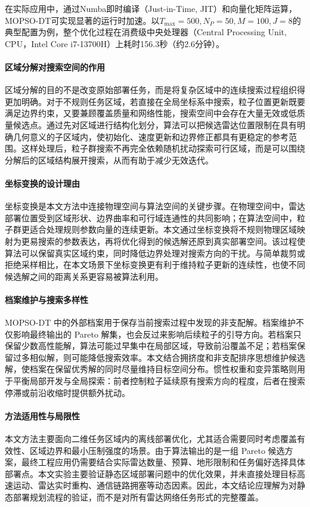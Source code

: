 在实际应用中，通过Numba即时编译（Just-in-Time, JIT）和向量化矩阵运算，MOPSO-DT可实现显著的运行时加速。以$T_{\max}=500, N_P=50, M=100, J=8$的典型配置为例，整个优化过程在消费级中央处理器（Central Processing Unit, CPU，Intel Core i7-13700H）上耗时156.3秒（约2.6分钟）。

\FloatBarrier


\paragraph{区域分解对搜索空间的作用}
区域分解的目的不是改变原始部署任务，而是将复杂区域中的连续搜索过程组织得更加明确。对于不规则任务区域，若直接在全局坐标系中搜索，粒子位置更新既要满足边界约束，又要兼顾覆盖质量和网络性能，搜索空间中会存在大量无效或低质量候选点。通过先对区域进行结构化划分，算法可以把候选雷达位置限制在具有明确几何意义的子区域内，使初始化、速度更新和边界修正都具有更稳定的参考范围。这样处理后，粒子群搜索不再完全依赖随机扰动探索可行区域，而是可以围绕分解后的区域结构展开搜索，从而有助于减少无效迭代。

\paragraph{坐标变换的设计理由}
坐标变换是本文方法中连接物理空间与算法空间的关键步骤。在物理空间中，雷达部署位置受到区域形状、边界曲率和可行域连通性的共同影响；在算法空间中，粒子群更适合处理规则参数向量的连续更新。本文通过坐标变换将不规则物理区域映射为更易搜索的参数表达，再将优化得到的候选解还原到真实部署空间。该过程使算法可以保留真实区域约束，同时降低边界处理对搜索方向的干扰。与简单裁剪或拒绝采样相比，在本文场景下坐标变换更有利于维持粒子更新的连续性，也使不同候选解之间的距离关系更容易被算法利用。

\paragraph{档案维护与搜索多样性}
MOPSO-DT 中的外部档案用于保存当前搜索过程中发现的非支配解。档案维护不仅影响最终输出的 Pareto 解集，也会反过来影响后续粒子的引导方向。若档案只保留少数高性能解，算法可能过早集中在局部区域，导致前沿覆盖不足；若档案保留过多相似解，则可能降低搜索效率。本文结合拥挤度和非支配排序思想维护候选解，使档案在保留优秀解的同时尽量维持目标空间分布。惯性权重和变异策略则用于平衡局部开发与全局探索：前者控制粒子延续原有搜索方向的程度，后者在搜索停滞或前沿收缩时提供额外扰动。

\paragraph{方法适用性与局限性}
本文方法主要面向二维任务区域内的离线部署优化，尤其适合需要同时考虑覆盖有效性、区域边界和最小压制强度的场景。由于算法输出的是一组 Pareto 候选方案，最终工程应用仍需要结合实际雷达数量、预算、地形限制和任务偏好选择具体部署点。本文实验主要验证静态区域部署问题中的优化效果，并未直接处理目标高速运动、雷达实时重构、通信链路拥塞等动态因素。因此，本文结论应理解为对静态部署规划流程的验证，而不是对所有雷达网络任务形式的完整覆盖。

